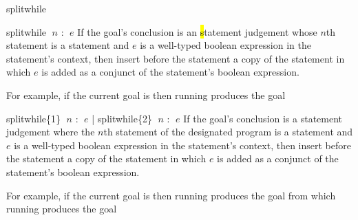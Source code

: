 \begin{tactic}{splitwhile}
  \begin{tsyntax}{splitwhile $\;n$ : $\;e$}
    If the goal's conclusion is an \hl statement judgement whose $n$th
    statement is a  statement and $e$ is a well-typed
    boolean expression in the  statement's context, then
    insert before the  statement a copy of the 
    statement in which $e$ is added as a conjunct of the statement's
    boolean expression.

    \medskip For example, if the current goal is
     then
    running 
    produces the goal
  \end{tsyntax}

  \begin{tsyntax}{splitwhile\{1\} $\;n$ : $\;e$ | splitwhile\{2\} $\;n$ : $\;e$}
    If the goal's conclusion is a \prhl statement judgement where the
    $n$th statement of the designated program is a 
    statement and $e$ is a well-typed boolean expression in the
     statement's context, then insert before the 
    statement a copy of the  statement in which $e$ is added
    as a conjunct of the statement's boolean expression.

    \medskip For example, if the current goal is
     then
    running 
    produces the goal
    from which
    running 
    produces the goal
  \end{tsyntax}
\end{tactic}
